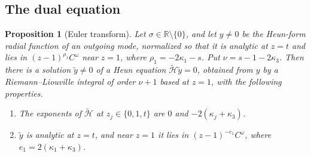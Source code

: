 \documentclass[11pt]{amsart}
\newtheorem{proposition}[theorem]{Proposition}
\theoremstyle{definition}
\theoremstyle{remark}
\numberwithin{equation}{section}
\newcommand{\R}{\mathbb{R}}
\begin{document}
\subsection{The dual equation}\label{subsec:dual}
\begin{proposition}[Euler transform]\label{prop:transform}
Let $\sigma\in\R\setminus\{0\}$, and let $y\ne0$ be the Heun-form radial function of an outgoing mode, normalized so
that it is analytic at $z=t$ and lies in $(z-1)^{\rho_1}C^\omega$ near $z=1$, where $\rho_1=-2\kappa_1-s$. Put
$\nu=s-1-2\kappa_3$. Then there is a solution $\tilde y\ne0$ of a Heun equation $\widetilde{\mathcal H}\tilde y=0$,
obtained from $y$ by a Riemann--Liouville integral of order $\nu+1$ based at $z=1$, with the following properties.
\begin{enumerate}[label=(\roman*)]
\item The exponents of $\widetilde{\mathcal H}$ at $z_j\in\{0,1,t\}$ are $0$ and $-2(\kappa_j+\kappa_3)$.
\item $\tilde y$ is analytic at $z=t$, and near $z=1$ it lies in $(z-1)^{-e_1}C^\omega$, where $e_1=2(\kappa_1+\kappa_3)$.
\end{enumerate}
\end{proposition}
\end{document}
